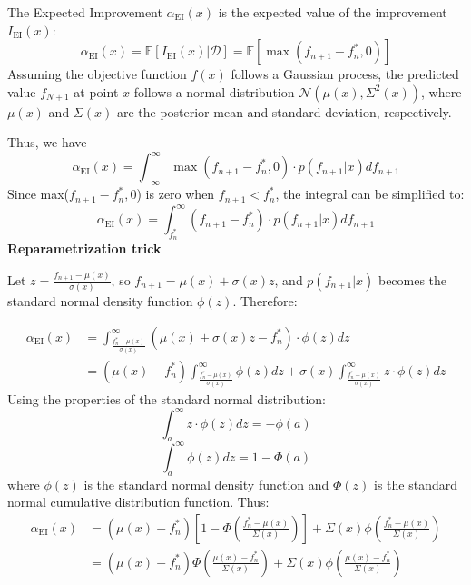 \documentclass[preprint,review,12pt,authoryear]{elsarticle}
\begin{document}
The Expected Improvement $\alpha_{\text{EI}}(x)$ is the expected value of the improvement $I_{\text{EI}}(x)$:
\begin{equation}
\alpha_{\text{EI}}(x)=\mathbb{E}[I_\text{EI}(x)|\mathcal{D}]=\mathbb{E}[\max(f_{n+1}-f^*_n,0)]
\end{equation}
Assuming the objective function $f(x)$ follows a Gaussian process, the predicted value $f_{N+1}$ at point $x$ follows a normal distribution $\mathcal{N}(\mu(x), \Sigma^2(x))$, where $\mu(x)$ and $\Sigma(x)$ are the posterior mean and standard deviation, respectively.

Thus, we have 
\begin{equation}
\alpha_{\text{EI}}(x)=\int_{-\infty}^{\infty}\max(f_{n+1}-f^*_n,0)\cdot p(f_{n+1}|x)df_{n+1}
\end{equation}
Since max($f_{n+1}-f^*_n, 0$) is zero when $f_{n+1}<f^*_n$, the integral can be simplified to:
\begin{equation}
  \alpha_{\text{EI}}(x)= \int_{f^*_n}^\infty(f_{n+1}-f^*_n)\cdot p(f_{n+1}|x)df_{n+1}
\end{equation}
\textbf{Reparametrization trick}

Let $z=\frac{f_{n+1}-\mu(x)}{\sigma(x)}$,  so $f_{n+1}=\mu(x)+\sigma(x)z$, and $p(f_{n+1}|x)$ becomes the standard normal density function $\phi(z)$. Therefore:

\begin{equation}
\begin{aligned}
  \alpha_{\text{EI}}(x)&=\int_{\frac{f^*_n-\mu(x)}{\sigma(x)}}^\infty(\mu(x)+\sigma(x)z -f^*_n)\cdot\phi(z)dz\\
    &=(\mu(x)-f^*_n)\int^\infty_{\frac{f^*_n-\mu(x)}{\sigma(x)}}\phi(z)dz + \sigma(x)\int^\infty_\frac{f_n^*-\mu(x)}{\sigma(x)}z\cdot \phi(z)dz
 \end{aligned}
\end{equation}
Using the properties of the standard normal distribution:
\begin{equation}
    \int_a^\infty z\cdot\phi(z)dz=-\phi(a)
\end{equation}
\begin{equation}
    \int_a^\infty\phi(z) dz = 1-\Phi(a)
\end{equation}
where $\phi (z)$ is the standard normal density function and $\Phi(z)$ is the standard normal cumulative distribution function.
Thus:
\begin{equation}
\begin{aligned}
  \alpha_{\text{EI}}(x)&=(\mu(x)-f^*_n)[1-\Phi(\frac{f^*_n-\mu(x)}{\Sigma(x)})]+\Sigma(x)\phi(\frac{f^*_n-\mu(x)}{\Sigma(x)}) \\
  &=(\mu(x)-f^*_n)\Phi(\frac{\mu(x)-f^*_n}{\Sigma(x)}) + \Sigma(x)\phi(\frac{\mu(x)-f^*_n}{\Sigma(x)}) \\
\end{aligned}
\end{equation}
\end{document}
